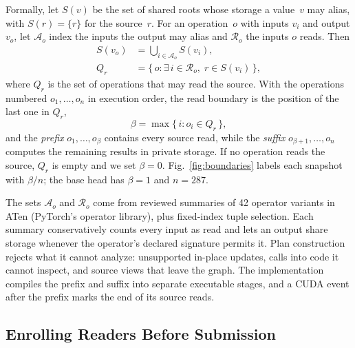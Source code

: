 \documentclass[conference]{IEEEtran}
\begin{document}
Formally, let $S(v)$ be the set of shared roots whose storage a value~$v$ may alias, with $S(r)=\{r\}$ for the source~$r$. For an operation~$o$ with inputs $v_i$ and output $v_o$, let $\mathcal{A}_o$ index the inputs the output may alias and $\mathcal{R}_o$ the inputs $o$ reads. Then
\begin{equation}
\begin{aligned}
S(v_o)&=\textstyle\bigcup_{i\in \mathcal{A}_o} S(v_i),\\
Q_r&=\{\, o : \exists\, i\in \mathcal{R}_o,\; r\in S(v_i) \,\},
\end{aligned}\label{eq:reads}
\end{equation}
where $Q_r$ is the set of operations that may read the source. With the operations numbered $o_1,\dots,o_n$ in execution order, the read boundary is the position of the last one in $Q_r$,
\begin{equation}
\beta=\max\{\, i : o_i\in Q_r \,\}, \label{eq:boundary}
\end{equation}
and the \emph{prefix} $o_1,\dots,o_\beta$ contains every source read, while the \emph{suffix} $o_{\beta+1},\dots,o_n$ computes the remaining results in private storage. If no operation reads the source, $Q_r$ is empty and we set $\beta=0$. Fig.~\ref{fig:boundaries} labels each snapshot with $\beta/n$; the base head has $\beta=1$ and $n=287$.

The sets $\mathcal{A}_o$ and $\mathcal{R}_o$ come from reviewed summaries of 42 operator variants in ATen (PyTorch's operator library), plus fixed-index tuple selection. Each summary conservatively counts every input as read and lets an output share storage whenever the operator's declared signature permits it. Plan construction rejects what it cannot analyze: unsupported in-place updates, calls into code it cannot inspect, and source views that leave the graph. The implementation compiles the prefix and suffix into separate executable stages, and a CUDA event after the prefix marks the end of its source reads.

\subsection{Enrolling Readers Before Submission}
\label{sec:enroll}
\end{document}
